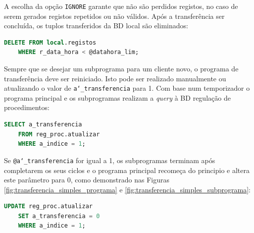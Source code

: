 \documentclass[11pt,twoside,a4paper]{report}
\begin{document}
A escolha da opção \texttt{IGNORE} garante que não são perdidos registos, no caso de serem gerados registos repetidos ou não válidos. Após a transferência ser concluída, os tuplos transferidos da BD local são eliminados:
\begin{lstlisting}[language = SQL]
	DELETE FROM local.registos
	WHERE r_data_hora < @datahora_lim;
\end{lstlisting}
Sempre que se desejar um subprograma para um cliente novo, o programa de transferência deve ser reiniciado. Isto pode ser realizado manualmente ou atualizando o valor de \texttt{a\char`_transferencia} para 1. Com base num temporizador o programa principal e os subprogramas realizam a \textit{query} à BD regulação de procedimentos:
\begin{lstlisting}[language = SQL]
	SELECT a_transferencia
	FROM reg_proc.atualizar
	WHERE a_indice = 1;
\end{lstlisting}
Se \texttt{@a\char`_transferencia} for igual a 1, os subprogramas terminam após completarem os seus ciclos e o programa principal recomeça do principio e altera este parâmetro para 0, como demonstrado nas Figuras \ref{fig:transferencia_simples_programa} e \ref{fig:transferencia_simples_subprograma}:
\begin{lstlisting}[language = SQL]
	UPDATE reg_proc.atualizar
	SET a_transferencia = 0
	WHERE a_indice = 1;
\end{lstlisting}
\end{document}
